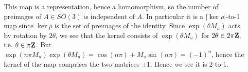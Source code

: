 \documentclass[12pt]{article}
\begin{document}
\begin{answer}
\begin{enumerate}[(a)]
This map is a representation, hence a homomorphism, so the number of preimages of $A\in SO(3)$ is independent of $A$. In particular it is a $|\ker\rho|$-to-1 map since $\ker\rho$ is the set of preimages of the identity. Since $\exp(\theta M_u)$ acts by rotation by $2\theta$, we see that the kernel consists of $\exp(\theta M_u)$ for $2\theta\in 2\pi\mathbf{Z}$, i.e. $\theta\in \pi\mathbf{Z}$. But $\exp(n\pi M_u)\exp(\theta M_u)=\cos(n\pi)+M_u\sin(n\pi)=(-1)^n$, hence the kernel of the map comprises the two matrices $\pm 1$. Hence we see it is 2-to-1.
\end{enumerate}
\end{answer}
\newpage
\fi
\end{document}
